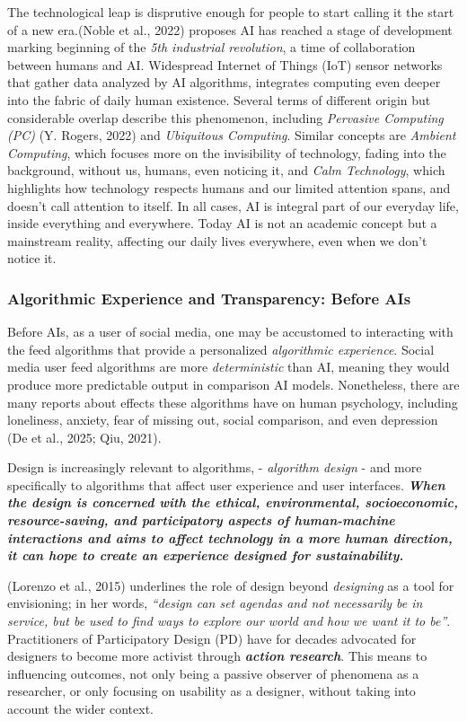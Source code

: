 \documentclass[
  letterpaper,
  DIV=11,
  numbers=noendperiod]{scrartcl}
\begin{document}
The technological leap is disprutive enough for people to start calling
it the start of a new era.(Noble et al., 2022) proposes AI has reached a
stage of development marking beginning of the \emph{5th industrial
revolution}, a time of collaboration between humans and AI. Widespread
Internet of Things (IoT) sensor networks that gather data analyzed by AI
algorithms, integrates computing even deeper into the fabric of daily
human existence. Several terms of different origin but considerable
overlap describe this phenomenon, including \emph{Pervasive Computing
(PC)} (Y. Rogers, 2022) and \emph{Ubiquitous Computing}. Similar
concepts are \emph{Ambient Computing}, which focuses more on the
invisibility of technology, fading into the background, without us,
humans, even noticing it, and \emph{Calm Technology}, which highlights
how technology respects humans and our limited attention spans, and
doesn't call attention to itself. In all cases, AI is integral part of
our everyday life, inside everything and everywhere. Today AI is not an
academic concept but a mainstream reality, affecting our daily lives
everywhere, even when we don't notice it.

\subsubsection{Algorithmic Experience and Transparency: Before
AIs}\label{algorithmic-experience-and-transparency-before-ais}

Before AIs, as a user of social media, one may be accustomed to
interacting with the feed algorithms that provide a personalized
\emph{algorithmic experience}. Social media user feed algorithms are
more \emph{deterministic} than AI, meaning they would produce more
predictable output in comparison AI models. Nonetheless, there are many
reports about effects these algorithms have on human psychology,
including loneliness, anxiety, fear of missing out, social comparison,
and even depression (De et al., 2025; Qiu, 2021).

Design is increasingly relevant to algorithms, - \emph{algorithm design}
- and more specifically to algorithms that affect user experience and
user interfaces. \textbf{\emph{When the design is concerned with the
ethical, environmental, socioeconomic, resource-saving, and
participatory aspects of human-machine interactions and aims to affect
technology in a more human direction, it can hope to create an
experience designed for sustainability.}}

(Lorenzo et al., 2015) underlines the role of design beyond
\emph{designing} as a tool for envisioning; in her words, \emph{``design
can set agendas and not necessarily be in service, but be used to find
ways to explore our world and how we want it to be''}. Practitioners of
Participatory Design (PD) have for decades advocated for designers to
become more activist through \textbf{\emph{action research}}. This means
to influencing outcomes, not only being a passive observer of phenomena
as a researcher, or only focusing on usability as a designer, without
taking into account the wider context.
\end{document}
